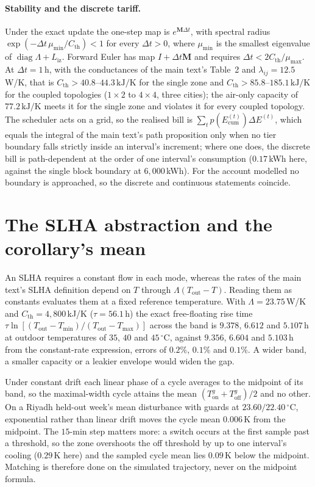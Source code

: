 \documentclass[11pt]{article}
\newcommand{\Tmin}{T_{\min}}
\newcommand{\Tmax}{T_{\max}}
\newcommand{\Tout}{T_{\mathrm{out}}}
\newcommand{\Cth}{C_{\mathrm{th}}}
\newcommand{\lij}{\lambda_{ij}}
\begin{document}
\paragraph{Stability and the discrete tariff.} Under the exact update the
one-step map is $e^{\mathbf{M}\Delta t}$, with spectral radius $\exp(-\Delta t\,\mu_{\min}/\Cth)<1$ for every $\Delta t>0$, where $\mu_{\min}$ is the smallest eigenvalue of $\operatorname{diag}\Lambda+L_{\mathrm{iz}}$. Forward Euler has map $I+\Delta t\mathbf{M}$ and requires $\Delta t<2\Cth/\mu_{\max}$. At $\Delta t=1\,$h, with the conductances of the main text's Table~2 and $\lij=12.5\,$W/K, that is $\Cth>40.8$--$44.3\,\text{kJ/K}$ for the single zone and $\Cth>85.8$--$185.1\,\text{kJ/K}$ for the coupled topologies ($1\times2$ to $4\times4$, three cities); the air-only capacity of $77.2\,\text{kJ/K}$ meets it for the single zone and violates it for every coupled topology. The scheduler acts on a grid, so the realised bill is $\sum_t p(E_{\mathrm{cum}}^{(t)})\Delta E^{(t)}$, which equals the integral of the main text's path proposition only when no tier boundary falls strictly inside an interval's increment; where one does, the discrete bill is path-dependent at the order of one interval's consumption ($0.17\,$kWh here, against the single block boundary at $6{,}000\,$kWh). For the account modelled no boundary is approached, so the discrete and continuous statements coincide.

\section{The SLHA abstraction and the corollary's mean}
\label{sec:s-slha}

An SLHA requires a constant flow in each mode, whereas the rates of the main text's SLHA definition depend on $T$ through $\Lambda(\Tout-T)$. Reading them as constants evaluates them at a fixed reference temperature. With $\Lambda=23.75\,$W/K and $\Cth=4{,}800\,$kJ/K ($\tau=56.1\,$h) the exact free-floating rise time $\tau\ln[(\Tout-\Tmin)/(\Tout-\Tmax)]$ across the band is $9.378$, $6.612$ and $5.107\,$h at outdoor temperatures of $35$, $40$ and $45\,^\circ$C, against $9.356$, $6.604$ and $5.103\,$h from the constant-rate expression, errors of $0.2\%$, $0.1\%$ and $0.1\%$. A wider band, a smaller capacity or a leakier envelope would widen the gap.

Under constant drift each linear phase of a cycle averages to the midpoint of its band, so the maximal-width cycle attains the mean $(T^{g}_{\mathrm{on}}+T^{g}_{\mathrm{off}})/2$ and no other. On a Riyadh held-out week's mean disturbance with guards at $23.60/22.40\,^\circ$C, exponential rather than linear drift moves the cycle mean $0.006\,$K from the midpoint. The $15$-min step matters more: a switch occurs at the first sample past a threshold, so the zone overshoots the off threshold by up to one interval's cooling ($0.29\,$K here) and the sampled cycle mean lies $0.09\,$K below the midpoint. Matching is therefore done on the simulated trajectory, never on the midpoint formula.
\end{document}
